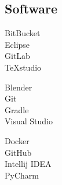 \documentclass[curriculum-vitae-eng]{subfiles}
\begin{document}
		\subsection*{Software}
			\begin{minipage}[t]{.3\textwidth}
				BitBucket \hfill {}\\
				Eclipse \hfill {}\\
				GitLab \hfill {}\\
				TeXstudio \hfill {}\\  %
			\end{minipage}
			\hfill
			\begin{minipage}[t]{.3\textwidth}
				Blender \hfill {}\\
				Git \hfill {}\\
				Gradle \hfill {}\\
				Visual Studio \hfill {}\\  %
			\end{minipage}
			\hfill
			\begin{minipage}[t]{.3\textwidth}
				Docker \hfill {}\\
				GitHub \hfill {}\\
				Intellij IDEA \hfill {}\\
				PyCharm \hfill {}\\ %
			\end{minipage}
\end{document}
